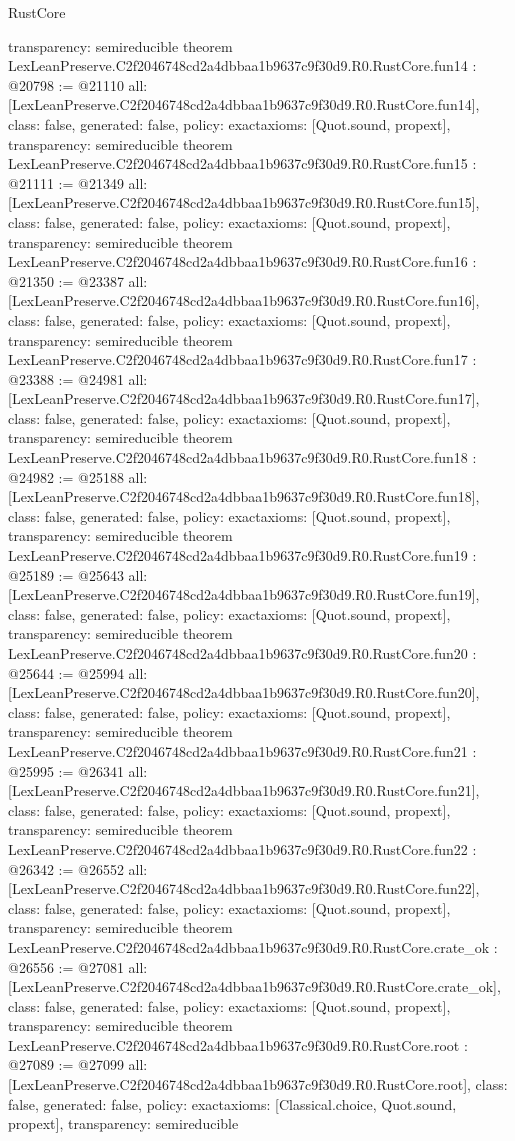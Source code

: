 \begin{lexlean}{RustCore}
\begin{coremodule}
{  transparency: semireducible
}
theorem LexLeanPreserve.C2f2046748cd2a4dbbaa1b9637c9f30d9.R0.RustCore.fun14 : @20798 := @21110 {
  all: [LexLeanPreserve.C2f2046748cd2a4dbbaa1b9637c9f30d9.R0.RustCore.fun14],
  class: false,
  generated: false,
  policy: exact{axioms: [Quot.sound, propext]},
  transparency: semireducible
}
theorem LexLeanPreserve.C2f2046748cd2a4dbbaa1b9637c9f30d9.R0.RustCore.fun15 : @21111 := @21349 {
  all: [LexLeanPreserve.C2f2046748cd2a4dbbaa1b9637c9f30d9.R0.RustCore.fun15],
  class: false,
  generated: false,
  policy: exact{axioms: [Quot.sound, propext]},
  transparency: semireducible
}
theorem LexLeanPreserve.C2f2046748cd2a4dbbaa1b9637c9f30d9.R0.RustCore.fun16 : @21350 := @23387 {
  all: [LexLeanPreserve.C2f2046748cd2a4dbbaa1b9637c9f30d9.R0.RustCore.fun16],
  class: false,
  generated: false,
  policy: exact{axioms: [Quot.sound, propext]},
  transparency: semireducible
}
theorem LexLeanPreserve.C2f2046748cd2a4dbbaa1b9637c9f30d9.R0.RustCore.fun17 : @23388 := @24981 {
  all: [LexLeanPreserve.C2f2046748cd2a4dbbaa1b9637c9f30d9.R0.RustCore.fun17],
  class: false,
  generated: false,
  policy: exact{axioms: [Quot.sound, propext]},
  transparency: semireducible
}
theorem LexLeanPreserve.C2f2046748cd2a4dbbaa1b9637c9f30d9.R0.RustCore.fun18 : @24982 := @25188 {
  all: [LexLeanPreserve.C2f2046748cd2a4dbbaa1b9637c9f30d9.R0.RustCore.fun18],
  class: false,
  generated: false,
  policy: exact{axioms: [Quot.sound, propext]},
  transparency: semireducible
}
theorem LexLeanPreserve.C2f2046748cd2a4dbbaa1b9637c9f30d9.R0.RustCore.fun19 : @25189 := @25643 {
  all: [LexLeanPreserve.C2f2046748cd2a4dbbaa1b9637c9f30d9.R0.RustCore.fun19],
  class: false,
  generated: false,
  policy: exact{axioms: [Quot.sound, propext]},
  transparency: semireducible
}
theorem LexLeanPreserve.C2f2046748cd2a4dbbaa1b9637c9f30d9.R0.RustCore.fun20 : @25644 := @25994 {
  all: [LexLeanPreserve.C2f2046748cd2a4dbbaa1b9637c9f30d9.R0.RustCore.fun20],
  class: false,
  generated: false,
  policy: exact{axioms: [Quot.sound, propext]},
  transparency: semireducible
}
theorem LexLeanPreserve.C2f2046748cd2a4dbbaa1b9637c9f30d9.R0.RustCore.fun21 : @25995 := @26341 {
  all: [LexLeanPreserve.C2f2046748cd2a4dbbaa1b9637c9f30d9.R0.RustCore.fun21],
  class: false,
  generated: false,
  policy: exact{axioms: [Quot.sound, propext]},
  transparency: semireducible
}
theorem LexLeanPreserve.C2f2046748cd2a4dbbaa1b9637c9f30d9.R0.RustCore.fun22 : @26342 := @26552 {
  all: [LexLeanPreserve.C2f2046748cd2a4dbbaa1b9637c9f30d9.R0.RustCore.fun22],
  class: false,
  generated: false,
  policy: exact{axioms: [Quot.sound, propext]},
  transparency: semireducible
}
theorem LexLeanPreserve.C2f2046748cd2a4dbbaa1b9637c9f30d9.R0.RustCore.crate_ok : @26556 := @27081 {
  all: [LexLeanPreserve.C2f2046748cd2a4dbbaa1b9637c9f30d9.R0.RustCore.crate_ok],
  class: false,
  generated: false,
  policy: exact{axioms: [Quot.sound, propext]},
  transparency: semireducible
}
theorem LexLeanPreserve.C2f2046748cd2a4dbbaa1b9637c9f30d9.R0.RustCore.root : @27089 := @27099 {
  all: [LexLeanPreserve.C2f2046748cd2a4dbbaa1b9637c9f30d9.R0.RustCore.root],
  class: false,
  generated: false,
  policy: exact{axioms: [Classical.choice, Quot.sound, propext]},
  transparency: semireducible
}


\end{coremodule}
\end{lexlean}
